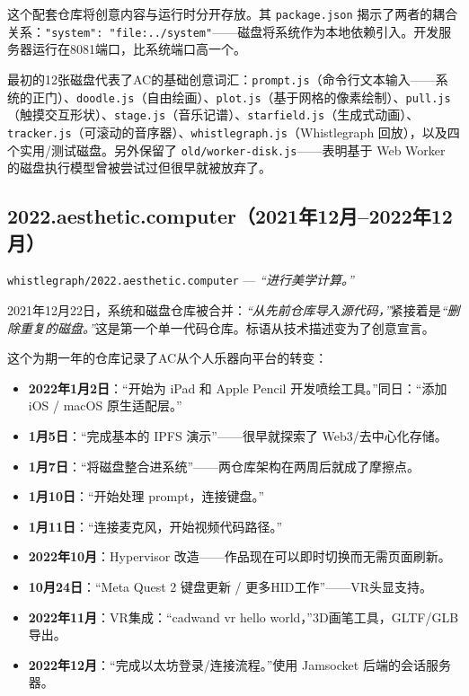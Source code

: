 \documentclass[10pt,letterpaper,twocolumn]{article}
\begin{document}
这个配套仓库将创意内容与运行时分开存放。其 \texttt{package.json} 揭示了两者的耦合关系：\texttt{"system": "file:../system"}——磁盘将系统作为本地依赖引入。开发服务器运行在8081端口，比系统端口高一个。

最初的12张磁盘代表了AC的基础创意词汇：\texttt{prompt.js}（命令行文本输入——系统的正门）、\texttt{doodle.js}（自由绘画）、\texttt{plot.js}（基于网格的像素绘制）、\texttt{pull.js}（触摸交互形状）、\texttt{stage.js}（音乐记谱）、\texttt{starfield.js}（生成式动画）、\texttt{tracker.js}（可滚动的音序器）、\texttt{whistlegraph.js}（Whistlegraph 回放），以及四个实用/测试磁盘。另外保留了 \texttt{old/worker-disk.js}——表明基于 Web Worker 的磁盘执行模型曾被尝试过但很早就被放弃了。

\subsection{2022.aesthetic.computer（2021年12月--2022年12月）}

\texttt{whistlegraph/2022.aesthetic.computer} --- \emph{``进行美学计算。''}

2021年12月22日，系统和磁盘仓库被合并：\emph{``从先前仓库导入源代码，''}紧接着是\emph{``删除重复的磁盘。''}这是第一个单一代码仓库。标语从技术描述变为了创意宣言。

这个为期一年的仓库记录了AC从个人乐器向平台的转变：

\begin{itemize}
  \item \textbf{2022年1月2日}：``开始为 iPad 和 Apple Pencil 开发喷绘工具。''同日：``添加 iOS / macOS 原生适配层。''
  \item \textbf{1月5日}：``完成基本的 IPFS 演示''——很早就探索了 Web3/去中心化存储。
  \item \textbf{1月7日}：``将磁盘整合进系统''——两仓库架构在两周后就成了摩擦点。
  \item \textbf{1月10日}：``开始处理 prompt，连接键盘。''
  \item \textbf{1月11日}：``连接麦克风，开始视频代码路径。''
  \item \textbf{2022年10月}：Hypervisor 改造——作品现在可以即时切换而无需页面刷新。
  \item \textbf{10月24日}：``Meta Quest 2 键盘更新 / 更多HID工作''——VR头显支持。
  \item \textbf{2022年11月}：VR集成：``cadwand vr hello world，''3D画笔工具，GLTF/GLB导出。
  \item \textbf{2022年12月}：``完成以太坊登录/连接流程。''使用 Jamsocket 后端的会话服务器。
\end{itemize}
\end{document}
